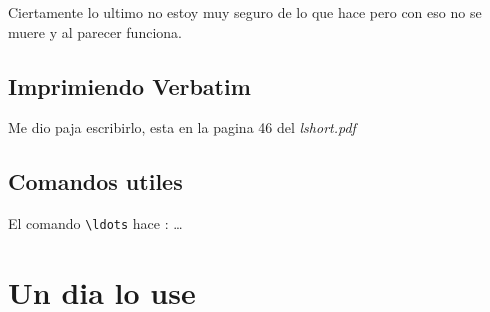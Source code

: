 \documentclass[letter,10pt]{article}
\begin{document}
Ciertamente lo ultimo no estoy muy seguro de lo que hace pero con eso no se muere y al parecer funciona.
\subsection{Imprimiendo Verbatim}

Me dio paja escribirlo, esta en la pagina 46 del \textit{lshort.pdf}

\subsection{Comandos utiles}
El comando \verb|\ldots| hace :  \ldots



\section{Un dia lo use}
\end{document}

